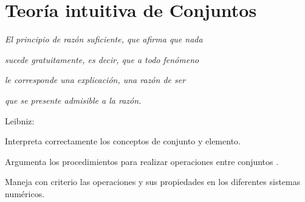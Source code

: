 
\chapter{Teoría intuitiva de Conjuntos}

\PartialToc

\hypersetup{linkcolor=ptctitle}

\vspace*{0.5cm}
 
\begin{flushright}
\textit{\footnotesize{}El principio de razón suficiente, que afirma
que nada}
\par\end{flushright}{\footnotesize \par}

\begin{flushright}
\textit{\footnotesize{}sucede gratuitamente, es decir, que a todo
fenómeno }
\par\end{flushright}{\footnotesize \par}

\begin{flushright}
\textit{\footnotesize{}le corresponde una explicación, una razón de
ser }
\par\end{flushright}{\footnotesize \par}

\begin{flushright}
\textit{\footnotesize{}que se presente admisible a la razón. }
\par\end{flushright}{\footnotesize \par}

\begin{flushright}
{\small{} }Leibniz: 
\par\end{flushright}

\vspace*{-1mm}

\begin{competencias}  \begin{lista}  

\item Interpreta correctamente los conceptos de conjunto y elemento. 

\item Argumenta los procedimientos para realizar operaciones entre
conjuntos . 

\item Maneja con criterio las operaciones y sus propiedades en los
diferentes sistemas numéricos.

\end{lista} \end{competencias}


